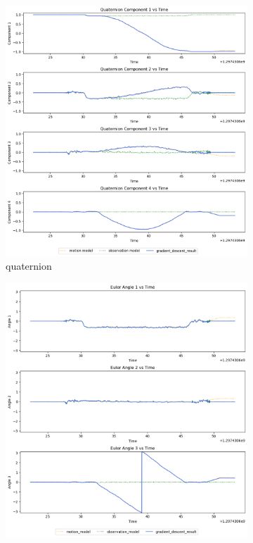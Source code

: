 \documentclass[conference]{IEEEtran}
\begin{document}
\begin{figure}[h]
    \centering
    \begin{subfigure}{0.4\textwidth}
        \includegraphics[width=\linewidth]{../img/10_qt.png}
        \caption{quaternion}
    \end{subfigure}
    \hfill
    \begin{subfigure}{0.4\textwidth}
        \includegraphics[width=\linewidth]{../img/10_ea.png}

\end{subfigure}
\end{figure}
\end{document}
